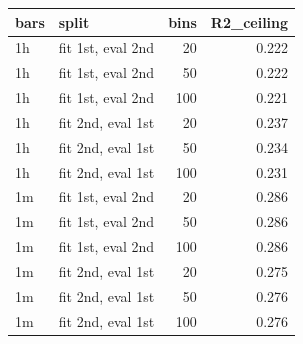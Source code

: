 \begin{tabular}{llrr}
\toprule
bars & split & bins & R2_ceiling \\
\midrule
1h & fit 1st, eval 2nd & 20 & 0.222 \\
1h & fit 1st, eval 2nd & 50 & 0.222 \\
1h & fit 1st, eval 2nd & 100 & 0.221 \\
1h & fit 2nd, eval 1st & 20 & 0.237 \\
1h & fit 2nd, eval 1st & 50 & 0.234 \\
1h & fit 2nd, eval 1st & 100 & 0.231 \\
1m & fit 1st, eval 2nd & 20 & 0.286 \\
1m & fit 1st, eval 2nd & 50 & 0.286 \\
1m & fit 1st, eval 2nd & 100 & 0.286 \\
1m & fit 2nd, eval 1st & 20 & 0.275 \\
1m & fit 2nd, eval 1st & 50 & 0.276 \\
1m & fit 2nd, eval 1st & 100 & 0.276 \\
\bottomrule
\end{tabular}
